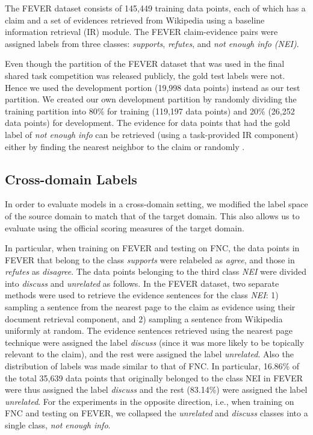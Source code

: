 {} The FEVER \cite{thorne2018fever} dataset consists of 145,449 training data points, each of which has a claim and a set of evidences retrieved from Wikipedia using a baseline information retrieval (IR) module.
The FEVER claim-evidence pairs were assigned labels from three classes: \textit{supports}, \textit{refutes}, and \textit{not enough info (NEI)}.

Even though the partition of the FEVER dataset that was used in the final shared task competition was released publicly, the gold test labels were not. Hence we used the development portion (19,998 data points) instead as our test partition. We created our own development partition by randomly dividing the training partition into 80\% for training (119,197 data points) and 20\% (26,252 data points) for development.  The evidence for data points that had the gold label of \textit{not enough info} can be retrieved (using a task-provided IR component) either by finding the nearest neighbor to the claim or randomly \cite{thorne2018fever}.


\subsection{Cross-domain Labels}
\label{sec:crossdomain}


In order to evaluate models in a cross-domain setting, we modified the label space of the source domain to match that of the target domain. This  also allows us to evaluate using the official scoring measures of the target domain.

In particular, when training on FEVER and testing on FNC, the data points in FEVER that belong to the class \textit{supports} were relabeled as \textit{agree}, and those in \textit{refutes} as \textit{disagree}. The data points belonging to the third class \textit{NEI} were divided into \textit{discuss} and \textit{unrelated} as follows.
In the FEVER dataset, two separate methods were used to retrieve the evidence sentences for the class \textit{NEI}: 1) sampling a sentence from the nearest page to the claim as evidence using their document retrieval component, and 2) sampling a sentence from Wikipedia uniformly at random. The evidence sentences retrieved using the nearest page technique were assigned the label \textit{discuss} (since it was more likely to be topically relevant to the claim), and the rest were assigned the label \textit{unrelated}. Also the distribution of labels was made similar to that of FNC. In particular, 16.86\% of the total 35,639 data points that originally belonged to the class NEI in FEVER were thus assigned the label \textit{discuss} and the rest (83.14\%) were assigned the label \textit{unrelated}. For the experiments in the opposite direction, i.e., when training on FNC and testing on FEVER, we collapsed the \textit{unrelated} and \textit{discuss} classes into a single class, \textit{not enough info}.



